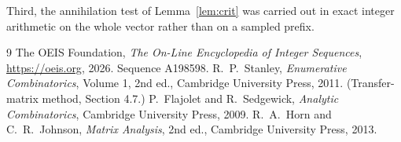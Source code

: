 \documentclass[11pt,a4paper]{article}
\theoremstyle{plain}
\theoremstyle{definition}
\begin{document}
Third, the annihilation test of Lemma~\ref{lem:crit} was carried out in exact integer
arithmetic on the whole vector rather than on a sampled prefix.

\begin{thebibliography}{9}
 The OEIS Foundation, \emph{The On-Line Encyclopedia of Integer
Sequences}, \url{https://oeis.org}, 2026. Sequence A198598.
 R.~P.~Stanley, \emph{Enumerative Combinatorics}, Volume 1, 2nd ed.,
Cambridge University Press, 2011. (Transfer-matrix method, Section 4.7.)
 P.~Flajolet and R.~Sedgewick, \emph{Analytic Combinatorics}, Cambridge
University Press, 2009.
 R.~A.~Horn and C.~R.~Johnson, \emph{Matrix Analysis}, 2nd ed., Cambridge
University Press, 2013.
\end{thebibliography}
\end{document}
